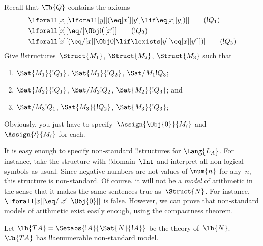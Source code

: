 \documentclass[../../../include/open-logic-section]{subfiles}
\begin{document}
\begin{prob}
Recall that $\Th{Q}$ contains the axioms
\begin{align*}
& \lforall[x][\lforall[y][(\eq[x'][y'] \lif \eq[x][y])]] \tag{$!Q_1$}\\
& \lforall[x][\eq/[\Obj 0][x']] \tag{$!Q_2$}\\
& \lforall[x][(\eq/[x][\Obj 0] \lif \lexists[y][\eq[x][y']])] \tag{$!Q_3$}
\end{align*}
Give !!{structure}s~$\Struct{M_1}$, $\Struct{M_2}$, $\Struct{M_3}$ such that
\begin{enumerate}
\item $\Sat{M_1}{!Q_1}$, $\Sat{M_1}{!Q_2}$, $\Sat/{M_1}{!Q_3}$;
\item $\Sat{M_2}{!Q_1}$, $\Sat/{M_2}{!Q_2}$, $\Sat{M_2}{!Q_3}$; and
\item $\Sat/{M_3}{!Q_1}$, $\Sat{M_3}{!Q_2}$, $\Sat{M_3}{!Q_3}$;
\end{enumerate}
Obviously, you just have to specify~$\Assign{\Obj{0}}{M_i}$ and
$\Assign{\prime}{M_i}$ for each.
\end{prob}

\begin{explain}
It is easy enough to specify non-standard !!{structure}s for
$\Lang{L_A}$. For instance, take the structure with !!{domain}~$\Int$
and interpret all non-logical symbols as usual. Since negative numbers
are not values of $\num{n}$ for any~$n$, this structure is
non-standard. Of course, it will not be a \emph{model} of arithmetic
in the sense that it makes the same sentences true
as~$\Struct{N}$. For instance, $\lforall[x][\eq/[x'][\Obj{0}]]$ is
false.  However, we can prove that non-standard models of arithmetic
exist easily enough, using the compactness theorem.
\end{explain}

\begin{prop}
Let $\Th{TA} = \Setabs{!A}{\Sat{N}{!A}}$ be the theory
of~$\Th{N}$. $\Th{TA}$ has !!a{enumerable} non-standard model.
\end{prop}
\end{document}
